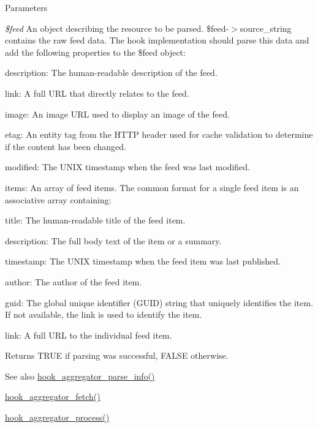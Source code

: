 \begin{DoxyParams}{Parameters}
\item[{\em \$feed}]An object describing the resource to be parsed. \$feed-\/$>$source\_\-string contains the raw feed data. The hook implementation should parse this data and add the following properties to the \$feed object:
\begin{DoxyItemize}
\item description: The human-\/readable description of the feed.
\item link: A full URL that directly relates to the feed.
\item image: An image URL used to display an image of the feed.
\item etag: An entity tag from the HTTP header used for cache validation to determine if the content has been changed.
\item modified: The UNIX timestamp when the feed was last modified.
\item items: An array of feed items. The common format for a single feed item is an associative array containing:
\begin{DoxyItemize}
\item title: The human-\/readable title of the feed item.
\item description: The full body text of the item or a summary.
\item timestamp: The UNIX timestamp when the feed item was last published.
\item author: The author of the feed item.
\item guid: The global unique identifier (GUID) string that uniquely identifies the item. If not available, the link is used to identify the item.
\item link: A full URL to the individual feed item.
\end{DoxyItemize}
\end{DoxyItemize}\end{DoxyParams}
\begin{DoxyReturn}{Returns}
TRUE if parsing was successful, FALSE otherwise.
\end{DoxyReturn}
\begin{DoxySeeAlso}{See also}
\hyperlink{group__hooks_ga4cf79b336cf009dee9487ae9d2249d9d}{hook\_\-aggregator\_\-parse\_\-info()} 

\hyperlink{group__hooks_ga459db08cc062e9ea3bf1f526daf91a4a}{hook\_\-aggregator\_\-fetch()} 

\hyperlink{group__hooks_gaf5da0f420ab3b27c1bc33f339c979ac7}{hook\_\-aggregator\_\-process()} 
\end{DoxySeeAlso}
